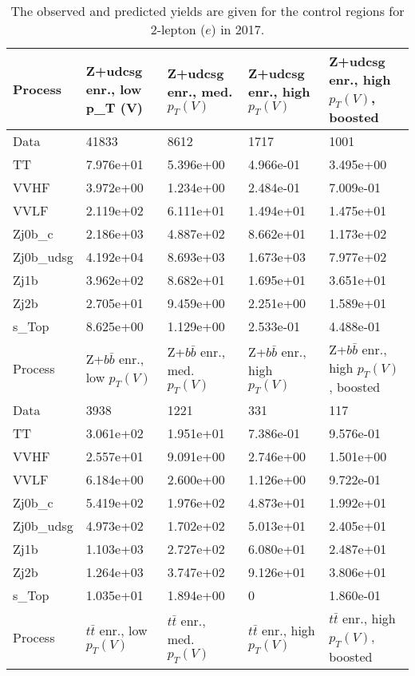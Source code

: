 \begin{table}
\centering
\caption[2017 2-lepton ($e$) control region yields]{
                  The observed and predicted yields are given for the
                  control regions for 2-lepton ($e$) in 2017.
                  }
{\footnotesize
\begin{tabularx}{\textwidth}{|X|X|X|X|X|}
\hline
Process & Z+udcsg enr., low p_{T} (V) & Z+udcsg enr., med. $p_{T}(V)$ & Z+udcsg enr., high $p_{T}(V)$ & Z+udcsg enr., high $p_{T}(V)$, boosted \\
\hline
Data & 41833 & 8612 & 1717 & 1001 \\
\hline
TT & 7.976e+01 & 5.396e+00 & 4.966e-01 & 3.495e+00 \\
VVHF & 3.972e+00 & 1.234e+00 & 2.484e-01 & 7.009e-01 \\
VVLF & 2.119e+02 & 6.111e+01 & 1.494e+01 & 1.475e+01 \\
Zj0b\_c & 2.186e+03 & 4.887e+02 & 8.662e+01 & 1.173e+02 \\
Zj0b\_udsg & 4.192e+04 & 8.693e+03 & 1.673e+03 & 7.977e+02 \\
Zj1b & 3.962e+02 & 8.682e+01 & 1.695e+01 & 3.651e+01 \\
Zj2b & 2.705e+01 & 9.459e+00 & 2.251e+00 & 1.589e+01 \\
s\_Top & 8.625e+00 & 1.129e+00 & 2.533e-01 & 4.488e-01 \\
\hline
\hline
Process & Z+$b\bar{b}$ enr., low $p_{T}(V)$ & Z+$b\bar{b}$ enr., med. $p_{T}(V)$ & Z+$b\bar{b}$ enr., high $p_{T}(V)$ & Z+$b\bar{b}$ enr., high $p_{T}(V)$, boosted \\
\hline
Data & 3938 & 1221 & 331 & 117 \\
\hline
TT & 3.061e+02 & 1.951e+01 & 7.386e-01 & 9.576e-01 \\
VVHF & 2.557e+01 & 9.091e+00 & 2.746e+00 & 1.501e+00 \\
VVLF & 6.184e+00 & 2.600e+00 & 1.126e+00 & 9.722e-01 \\
Zj0b\_c & 5.419e+02 & 1.976e+02 & 4.873e+01 & 1.992e+01 \\
Zj0b\_udsg & 4.973e+02 & 1.702e+02 & 5.013e+01 & 2.405e+01 \\
Zj1b & 1.103e+03 & 2.727e+02 & 6.080e+01 & 2.487e+01 \\
Zj2b & 1.264e+03 & 3.747e+02 & 9.126e+01 & 3.806e+01 \\
s\_Top & 1.035e+01 & 1.894e+00 & 0 & 1.860e-01 \\
\hline
\hline
Process & $t\bar{t}$ enr., low $p_{T}(V)$ & $t\bar{t}$ enr., med. $p_{T}(V)$ & $t\bar{t}$ enr., high $p_{T}(V)$ & $t\bar{t}$ enr., high $p_{T}(V)$, boosted \\

\end{tabularx}}
\end{table}
